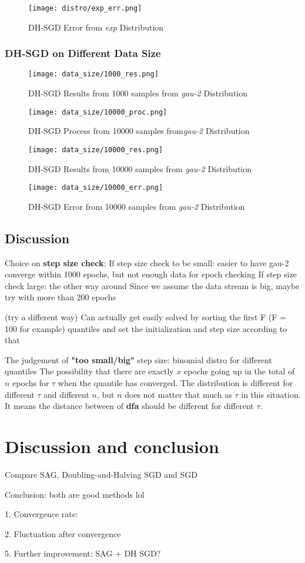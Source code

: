 \begin{figure}[H]
    \centering
	\texttt{[image: distro/exp\_err.png]}
	\caption{DH-SGD Error from \textit{exp} Distribution}
\end{figure}

\subsubsection{DH-SGD on Different Data Size}
\label{subsubsec: DH_SGD_exp_data_size}

\begin{figure}[H]
    \centering
	\texttt{[image: data\_size/1000\_res.png]}
	\caption{DH-SGD Results from 1000 samples from \textit{gau-2} Distribution}
\end{figure}

\begin{figure}[H]
    \centering
	\texttt{[image: data\_size/10000\_proc.png]}
	\caption{DH-SGD Process from 10000 samples from\textit{gau-2} Distribution}
\end{figure}

\begin{figure}[H]
    \centering
	\texttt{[image: data\_size/10000\_res.png]}
	\caption{DH-SGD Results from 10000 samples from \textit{gau-2} Distribution}
\end{figure}

\begin{figure}[H]
    \centering
	\texttt{[image: data\_size/10000\_err.png]}
	\caption{DH-SGD Error from 10000 samples from \textit{gau-2} Distribution}
\end{figure}

\subsection{Discussion}

Choice on \textbf{step size check}:
    If step size check to be small: easier to have gau-2 converge within 1000 epochs, but not enough data for epoch checking
    If step size check large: the other way around
    Since we assume the data stream is big, maybe try with more than 200 epochs

    (try a different way) Can actually get easily solved by sorting the first F (F = 100 for example) quantiles and set the initialization and step size according to that

The judgement of\textbf{ "too small/big"} step size: 
    binomial distro for different quantiles The possibility that there are exactly $x$ epochs  going up in the total of $n$ epochs for $\tau$ when the quantile has converged.
    The distribution is different for different $\tau$ and different $n$, but $n$ does not matter that much as $\tau$ in this situation. It means the distance between of \textbf{dfa} should be different for different $\tau$.


\section{Discussion and conclusion}

Compare SAG, Doubling-and-Halving SGD and SGD

Conclusion: both are good methods lol

1. Convergence rate:

2. Fluctuation after convergence

5. Further improvement: SAG + DH SGD?
